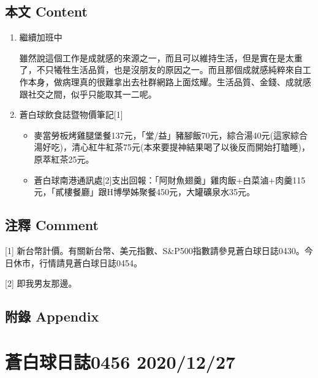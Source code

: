 \documentclass[a5paper, 10pt
]{book}
\providecommand{\tightlist}{%
  \setlength{\itemsep}{0pt}\setlength{\parskip}{0pt}}
\begin{document}
\hypertarget{ux672cux6587-content-25}{%
\subsection{本文 Content}\label{ux672cux6587-content-25}}

\begin{enumerate}
\def\labelenumi{\arabic{enumi}.}
\item
  繼續加班中

  雖然說這個工作是成就感的來源之一，而且可以維持生活，但是實在是太重了，不只犧牲生活品質，也是沒朋友的原因之一。而且那個成就感純粹來自工作本身，做病理真的很難拿出去社群網路上面炫耀。生活品質、金錢、成就感跟社交之間，似乎只能取其一二呢。
\item
  蒼白球飲食誌暨物價筆記{[}1{]}

  \begin{itemize}
  \tightlist
  \item
    麥當勞板烤雞腿堡餐137元，「堂/益」豬腳飯70元，綜合湯40元(這家綜合湯好吃)，清心紅牛紅茶75元(本來要提神結果喝了以後反而開始打瞌睡)，原萃紅茶25元。
  \item
    蒼白球南港通訊處{[}2{]}支出回報：「阿財魚翅羹」雞肉飯+白菜滷+肉羹115元，「貳樓餐廳」跟H博學姊聚餐450元，大罐礦泉水35元。
  \end{itemize}
\end{enumerate}

\hypertarget{ux6ce8ux91cb-comment-25}{%
\subsection{注釋 Comment}\label{ux6ce8ux91cb-comment-25}}

{[}1{]}
新台幣計價。有關新台幣、美元指數、S\&P500指數請參見蒼白球日誌0430。今日休市，行情請見蒼白球日誌0454。

{[}2{]} 即我男友那邊。

\hypertarget{ux9644ux9304-appendix-25}{%
\subsection{附錄 Appendix}\label{ux9644ux9304-appendix-25}}

\hypertarget{ux84bcux767dux7403ux65e5ux8a8c0456-20201227}{%
\section{蒼白球日誌0456
2020/12/27}\label{ux84bcux767dux7403ux65e5ux8a8c0456-20201227}}
\end{document}
